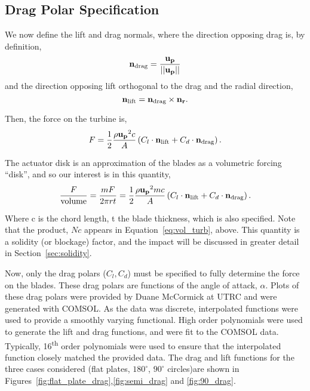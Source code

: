 \subsection{Drag Polar Specification}

We now define the lift and drag normals, where the direction opposing
drag is, by definition,  
\begin{equation}
{\bf n_{\text{drag}}} = \frac{{\bf u_p}}{||{\bf u_p}||} 
\end{equation}
and the direction opposing lift orthogonal to the drag and the radial 
direction,  
\begin{equation}
{\bf n_{\text{lift}}}= {\bf n_{\text{drag}}} \times {\bf n_r}. 
\end{equation}

Then, the force on the turbine is, 
\begin{equation}
 F = \frac{1}{2}\frac{\rho {\bf u_p}^2 c}{A}\left(C_l \cdot
					      {\bf n_\text{lift}} + C_d \cdot
					      {\bf n_\text{drag}}  \right).
\label{eq:force_turb}
\end{equation}

The actuator disk is an approximation of the blades as a volumetric
forcing ``disk'', and so our interest is in this quantity,
\begin{equation}
\frac{F}{\text{volume}} = \frac{m F}{2 \pi r t} = \frac{1}{2}\frac{\rho
 {\bf u_p}^2 m c}{A}\left(C_l \cdot {\bf n_\text{lift}} + C_d \cdot {\bf
		   n_\text{drag}} \right).  
\label{eq:vol_turb}
\end{equation}

Where c is the chord length, t the blade thickness, which is also specified. 
Note that the product, $N c$ appears in Equation~\ref{eq:vol_turb},
above. This quantity is a solidity (or blockage) factor, and the impact
will be discussed in greater detail in
Section~\ref{sec:solidity}.

Now, only the drag polars ($C_l,C_d$) must be specified to fully
determine the force on the blades. These drag polars are functions of
the angle of attack, $\alpha$. Plots of these drag polars were provided
by Duane McCormick at UTRC and were generated with COMSOL. As the data
was discrete, interpolated functions were used to provide a smoothly
varying functional. High order polynomials were used to generate the
lift and drag functions, and were fit to the COMSOL data. Typically,
16\textsuperscript{th} order polynomials were used to ensure that the
interpolated function closely matched the provided data. The drag and
lift functions for the three cases considered (flat plates,
$180^{\circ}$, $90^{\circ}$ circles)are shown in
Figures~\ref{fig:flat_plate_drag},\ref{fig:semi_drag} and
\ref{fig:90_drag}. 

